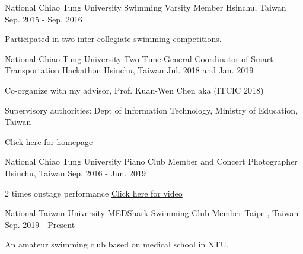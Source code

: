 

\begin{cventries}

\cventry
    {National Chiao Tung University} %
    {Swimming Varsity Member} %
    {Hsinchu, Taiwan} %
    {Sep. 2015 - Sep. 2016} %
    {
      \begin{cvitems} %
        \item {Participated in two inter-collegiate swimming competitions.}
      \end{cvitems}
    }

\cventry
    {National Chiao Tung University} %
    {Two-Time General Coordinator of Smart Transportation Hackathon} %
    {Hsinchu, Taiwan} %
    {Jul. 2018 and Jan. 2019} %
    {
      \begin{cvitems} %
        \item {Co-organize with my advisor, Prof. Kuan-Wen Chen aka (ITCIC 2018)}
        \item {Supervisory authorities: Dept of Information Technology, Ministry of Education, Taiwan}
        \item \href{http://covis.cs.nctu.edu.tw/ITCIC2018/}{Click here for homepage}
      \end{cvitems}
    }

\cventry
    {National Chiao Tung University} %
    {Piano Club Member and Concert Photographer} %
    {Hsinchu, Taiwan} %
    {Sep. 2016 - Jun. 2019} %
    {
      \begin{cvitems} %
        \item {2 times onstage performance \href{https://www.youtube.com/watch?v=3xeSBrs6m5w&t=2s}{Click here for video}}
      \end{cvitems}
    }
\cventry
    {National Taiwan University} %
    {MEDShark Swimming Club Member} %
    {Taipei, Taiwan} %
    {Sep. 2019 - Present} %
    {
      \begin{cvitems} %
        \item {An amateur swimming club based on medical school in NTU.}
      \end{cvitems}
    }
\end{cventries}
